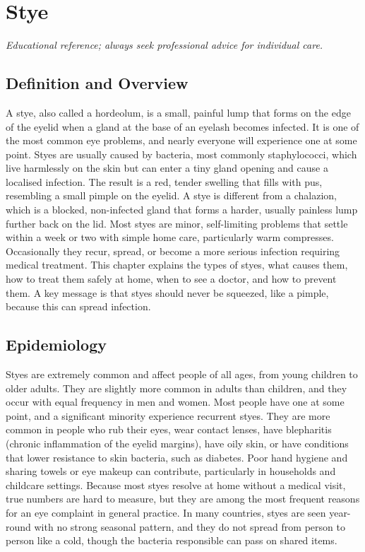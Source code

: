 \chapter{Stye}

\medskip
\noindent\textit{Educational reference; always seek professional advice for individual care.}

\section*{Definition and Overview}
A stye, also called a hordeolum, is a small, painful lump that forms on the edge of the eyelid when a gland at the base of an eyelash becomes infected. It is one of the most common eye problems, and nearly everyone will experience one at some point. Styes are usually caused by bacteria, most commonly staphylococci, which live harmlessly on the skin but can enter a tiny gland opening and cause a localised infection. The result is a red, tender swelling that fills with pus, resembling a small pimple on the eyelid. A stye is different from a chalazion, which is a blocked, non-infected gland that forms a harder, usually painless lump further back on the lid. Most styes are minor, self-limiting problems that settle within a week or two with simple home care, particularly warm compresses. Occasionally they recur, spread, or become a more serious infection requiring medical treatment. This chapter explains the types of styes, what causes them, how to treat them safely at home, when to see a doctor, and how to prevent them. A key message is that styes should never be squeezed, like a pimple, because this can spread infection.

\section*{Epidemiology}
Styes are extremely common and affect people of all ages, from young children to older adults. They are slightly more common in adults than children, and they occur with equal frequency in men and women. Most people have one at some point, and a significant minority experience recurrent styes. They are more common in people who rub their eyes, wear contact lenses, have blepharitis (chronic inflammation of the eyelid margins), have oily skin, or have conditions that lower resistance to skin bacteria, such as diabetes. Poor hand hygiene and sharing towels or eye makeup can contribute, particularly in households and childcare settings. Because most styes resolve at home without a medical visit, true numbers are hard to measure, but they are among the most frequent reasons for an eye complaint in general practice. In many countries, styes are seen year-round with no strong seasonal pattern, and they do not spread from person to person like a cold, though the bacteria responsible can pass on shared items.


